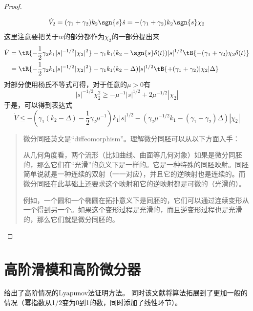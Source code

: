 \begin{proof}
\begin{align*}
	\end{align*}
	\begin{align*}
		\dot{V}_2=(\gamma_1+\gamma_2)k_2  \sgn{s}\dot{s}
		=-(\gamma_1+\gamma_2)k_2  \sgn{s}\chi_2
	\end{align*}
	这里注意要把关于$w$的部分都作为$\chi_2$的一部分提出来
	\begin{align*}
		\dot{V}
		&=\tR{-\frac12 \gamma_2 k_1 |s|^{-1/2} |\chi_2|^2}
		-\gamma_1 k_1 (k_2-\sgn{s} \delta(t))|s|^{1/2}
		\tB{-(\gamma_1+\gamma_2)\chi_2 \delta(t)}
		\\
		&=\tR{-\frac12 \gamma_2 k_1 |s|^{-1/2} |\chi_2|^2}
		-\gamma_1 k_1 (k_2-\Delta)|s|^{1/2}
		\tB{+(\gamma_1+\gamma_2)|\chi_2| \Delta}
	\end{align*}
	对部分使用杨氏不等式可得，对于任意的$\mu>0$有
	\begin{equation}
		|s|^{-1/2}\chi_2^2\geq 
		-\mu^{-1}|s|^{1/2}
		+2{\mu^{-1/2}}|\chi_2|
	\end{equation}
	于是，可以得到表达式
	\begin{equation}
		\dot{V}\leq 
		-\left(
			\gamma_1 (k_2-\Delta)-\frac12 \gamma_2 \mu^{-1}
		\right)
		k_1 |s|^{1/2}
		-\left( \gamma_2 \mu^{-1/2}k_1-(\gamma_1+\gamma_2)\Delta\right)
		|\chi_2|
	\end{equation}
	
	
	\begin{quote}
		微分同胚英文是“diffeomorphism”。理解微分同胚可以从以下方面入手：
		
		从几何角度看，两个流形（比如曲线、曲面等几何对象）如果是微分同胚的，那么它们在“光滑”的意义下是一样的。它是一种特殊的同胚映射。同胚简单说就是一种连续的双射（一一对应），并且它的逆映射也是连续的。而微分同胚在此基础上还要求这个映射和它的逆映射都是可微的（光滑的）。
		
		例如，一个圆和一个椭圆在拓扑意义下是同胚的，它们可以通过连续变形从一个得到另一个。如果这个变形过程是光滑的，而且逆变形过程也是光滑的，那么它们就是微分同胚的。
	\end{quote}
	
	
\end{proof}





\section{高阶滑模和高阶微分器}

\cite{morenoSurveyHighorderSlidingmode2023}给出了高阶情况的Lyapunov法证明方法。
同时该文献将算法拓展到了更加一般的情况（幂指数从1/2变为0到1的数，同时添加了线性环节）。

